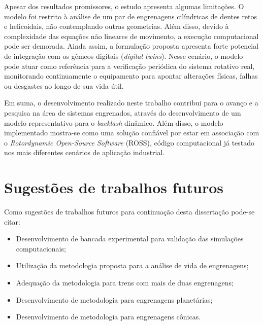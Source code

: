 Apesar dos resultados promissores, o estudo apresenta algumas limitações. O modelo foi restrito à análise de um par de engrenagens cilíndricas de dentes retos e helicoidais, não contemplando outras geometrias. Além disso, devido à complexidade das equações não lineares de movimento, a execução computacional pode ser demorada.
Ainda assim, a formulação proposta apresenta forte potencial de integração com os gêmeos digitais (\textit{digital twins}). Nesse cenário, o modelo pode atuar como referência para a verificação periódica do sistema rotativo real, monitorando continuamente o equipamento para apontar alterações físicas, falhas ou desgastes ao longo de sua vida útil.

Em suma, o desenvolvimento realizado neste trabalho contribui para o avanço e a pesquisa na área de sistemas engrenados, através do desenvolvimento de um modelo representativo para o \textit{backlash} dinâmico. Além disso, o modelo implementado mostra-se como uma solução confiável por estar em associação com o \textit{Rotordynamic Open-Source Software} (ROSS), código computacional já testado nos mais diferentes cenários de aplicação industrial.


\section{Sugestões de trabalhos futuros}

Como sugestões de trabalhos futuros para continuação desta dissertação pode-se citar:

\begin{itemize}
	\item Desenvolvimento de bancada experimental para validação das simulações computacionais;
	\item Utilização da metodologia proposta para a análise de vida de engrenagens; 
	\item Adequação da metodologia para trens com mais de duas engrenagens;
	\item Desenvolvimento de metodologia para engrenagens planetárias;
	\item Desenvolvimento de metodologia para engrenagens cônicas.
\end{itemize}